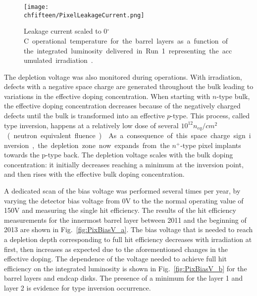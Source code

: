 \begin{figure}[!htb]
 \begin{center}
 \texttt{[image: \\chfifteen/PixelLeakageCurrent.png]}
 \end{center}
 \caption{Leakage current scaled to 0\unit{$^\circ$C} operational temperature for the barrel layers as a function of the integrated luminosity delivered in Run~1 representing the accumulated irradiation~\cite{PixelOffline}.}
 \label{fig:PixLeakageCurrent}
\end{figure}

The depletion voltage was also monitored during operations.
With irradiation, defects with a negative space charge are generated throughout the bulk leading to variations in the effective doping concentration.
When starting with $n$-type bulk, the effective doping concentration decreases because of the negatively charged defects until the bulk is transformed into an effective $p$-type.
This process, called type inversion, happens at a relatively low dose of several $10^{12}$\unit{$n_{eq}/cm^2$} (neutron equivalent fluence)~\cite{PixelDetectorsBook2006}.
As a consequence of this space charge sign inversion, the depletion zone now expands from the $n^+$-type pixel implants towards the p-type back.
The depletion voltage scales with the bulk doping concentration: it initially decreases reaching a minimum at the inversion point, and then rises with the effective bulk doping concentration.

A dedicated scan of the bias voltage was performed several times per year, by varying the detector bias voltage from 0\unit{V} to the the normal operating value of 150\unit{V} and measuring the single hit efficiency.
The results of the hit efficiency measurements for the innermost barrel layer between 2011 and the beginning of 2013 are shown in Fig.~\ref{fig:PixBiasV_a}.
The bias voltage that is needed to reach a depletion depth corresponding to full hit efficiency decreases with irradiation at first, then increases as expected due to the aforementioned changes in the effective doping.
The dependence of the voltage needed to achieve full hit efficiency on the integrated luminosity is shown in Fig.~\ref{fig:PixBiasV_b} for the barrel layers and endcap disks.
The presence of a minimum for the layer 1 and layer 2 is evidence for type inversion occurrence.\\

